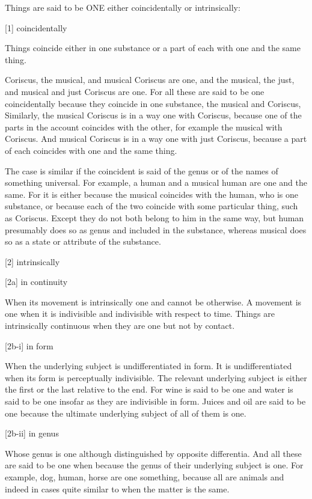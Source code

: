 
Things are said to be ONE either coincidentally or intrinsically:

[1]     coincidentally

        Things coincide either in one substance or
        a part of each with one and the same thing.

        Coriscus, the musical, and musical Coriscus are one,
        and the musical, the just, and musical and just Coriscus are one.
        For all these are said to be one coincidentally
        because they coincide in one substance, the musical and Coriscus,
        Similarly, the musical Coriscus is in a way one with Coriscus,
        because one of the parts in the account coincides with the other,
        for example the musical with Coriscus. And musical Coriscus is
        in a way one with just Coriscus, because a part of each coincides
        with one and the same thing.

        The case is similar if the coincident is said of the genus or
        of the names of something universal. For example, a human and
        a musical human are one and the same. For it is either because
        the musical coincides with the human, who is one substance,
        or because each of the two coincide with some particular thing,
        such as Coriscus. Except they do not both belong to him in the same way,
        but human presumably does so as genus and included in the substance,
        whereas musical does so as a state or attribute of the substance.

[2]     intrinsically

[2a]    in continuity

        When its movement is intrinsically one and cannot be otherwise.
        A movement is one when it is indivisible and indivisible with respect to time.
        Things are intrinsically continuous when they are one but not by contact.

[2b-i]  in form

        When the underlying subject is undifferentiated in form.
        It is undifferentiated when its form is perceptually indivisible.
        The relevant underlying subject is either the first or the last
        relative to the end. For wine is said to be one and water is said to be one
        insofar as they are indivisible in form. Juices and oil are said to be one
        because the ultimate underlying subject of all of them is one.

[2b-ii] in genus
            
        Whose genus is one although distinguished by opposite differentia.
        And all these are said to be one when because the genus of their
        underlying subject is one. For example, dog, human, horse are one something,
        because all are animals and indeed in cases quite similar to when the 
        matter is the same.

